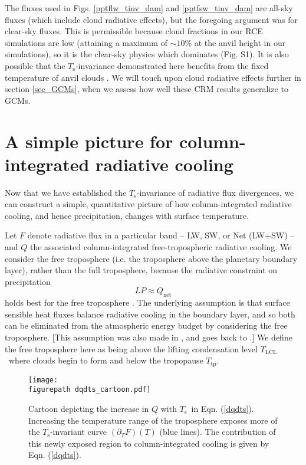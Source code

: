 \documentclass[9pt,twocolumn,twoside,lineno]{pnas-new}
\newcommand{\beqn}{\begin{equation}}
\newcommand{\eeqn}{\end{equation}}
\newcommand{\eqnref}[1]{(\ref{#1})}
\newcommand{\ppt}{\ensuremath{\partial_T}}
\newcommand{\Qnet}{\ensuremath{Q_\mathrm{net}}}
\newcommand{\Ts}{\ensuremath{T_\mathrm{s}}}
\newcommand{\Tlcl}{\ensuremath{T_\mathrm{LCL}}}
\newcommand{\Ttp}{\ensuremath{T_\mathrm{tp}}}
\newcommand{\figurepath}{./}
\begin{document}
The fluxes used in Figs.  \ref{pptflw_tinv_dam} and \ref{pptfsw_tinv_dam} are all-sky fluxes (which include cloud radiative effects), but the foregoing argument was for clear-sky fluxes. This is permissible because cloud fractions in our RCE simulations are low (attaining a maximum of $\sim 10 \%$ at the anvil height in our simulations), so it is the clear-sky physics which dominates (Fig. S1). It is also possible that the \Ts-invariance demonstrated here benefits from the fixed temperature of anvil clouds \cite{hartmann2002,kuang2007,harrop2012}. We will touch upon cloud radiative effects further in section \ref{sec_GCMs}, when we assess how well these CRM results generalize to GCMs.
 
		
\section{A simple picture for column-integrated radiative cooling} \label{sec_simple_Q}

Now that we have established  the \Ts-invariance of radiative flux divergences, we can construct a simple, quantitative picture of how column-integrated radiative cooling, and hence precipitation,  changes with surface temperature. 
	
	Let $F$ denote radiative flux in a particular band -- LW, SW, or Net (LW+SW) -- and $Q$ the associated column-integrated free-tropospheric radiative cooling. We consider  the free troposphere (i.e. the troposphere above the planetary boundary layer), rather than the full troposphere, because the radiative constraint on precipitation 
		\beqn
			LP \approx \Qnet
		\label{p_constraint}
		\eeqn
		 holds best for the free troposphere  \cite{ogorman2012}. The underlying assumption is that surface sensible heat fluxes balance radiative cooling in the boundary layer, and so both can be eliminated from the atmospheric energy budget by considering the free troposphere. [This assumption was also made in \cite{takahashi2009}, and goes back to \cite{betts1989}.] We define the free troposphere here as being above the lifting condensation level \Tlcl\ where clouds begin to form and below the tropopause \Ttp.
	
\begin{figure}[t]
	\begin{center}
			\texttt{[image: \\figurepath dqdts\_cartoon.pdf]}
		\caption{Cartoon depicting the increase in $Q$ with \Ts\ in Eqn. \eqnref{dqdts}. Increasing the temperature range of the troposphere  exposes more of the \Ts-invariant curve $(\ppt F)(T)$ (blue lines). The contribution  of this newly exposed region to column-integrated cooling is given by Eqn. \eqnref{dqdts}.
		\label{dqdts_cartoon}
		}
	\end{center}
\end{figure}
\end{document}
